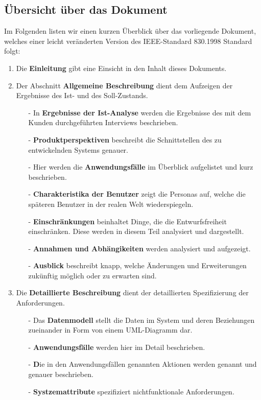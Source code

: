 \documentclass[fontsize=12pt,paper=a4,twoside]{scrartcl}
\begin{document}
\subsection{Übersicht über das Dokument}
Im Folgenden listen wir einen kurzen Überblick über das vorliegende Dokument, welches einer leicht veränderten Version des IEEE-Standard 830.1998 Standard folgt:

\begin{enumerate}
\item Die \textbf{Einleitung} gibt eine Einsicht in den Inhalt dieses Dokuments.
\item Der Abschnitt \textbf{Allgemeine Beschreibung} dient dem Aufzeigen der Ergebnisse des Ist- und des Soll-Zustands.
\begin{itemize}
\item[-]In \textbf{Ergebnisse der Ist-Analyse} werden die Ergebnisse des mit dem Kunden durchgeführten Interviews beschrieben.
\item[-] \textbf{Produktperspektiven} beschreibt die Schnittstellen des zu entwickelnden Systems genauer.
\item[-] Hier werden die \textbf{Anwendungsfälle} im Überblick aufgelistet und kurz beschrieben.
\item[-] \textbf{Charakteristika der Benutzer} zeigt die Personas auf, welche die späteren Benutzer in der realen Welt wiederspiegeln.
\item[-] \textbf{Einschränkungen} beinhaltet Dinge, die die Entwurfsfreiheit einschränken. Diese werden in diesem Teil analysiert und dargestellt.
\item[-] \textbf{Annahmen und Abhängikeiten} werden analysiert und aufgezeigt.
\item[-] \textbf{Ausblick} beschreibt knapp, welche Änderungen und Erweiterungen zukünftig möglich oder zu erwarten sind.
\end{itemize}
\item Die \textbf{Detaillierte Beschreibung} dient der detaillierten Spezifizierung der Anforderungen.
\begin{itemize}
\item[-] Das \textbf{Datenmodell} stellt die Daten im System und deren Beziehungen zueinander in Form von einem UML-Diagramm dar.
\item[-] \textbf{Anwendungsfälle} werden hier im Detail beschrieben.
\item[-] \textbf Die in den Anwendungsfällen genannten {Aktionen} werden genannt und genauer beschrieben.
\item[-] \textbf{Systzemattribute} spezifiziert nichtfunktionale Anforderungen.
\end{itemize}
\end{enumerate}
\end{document}
